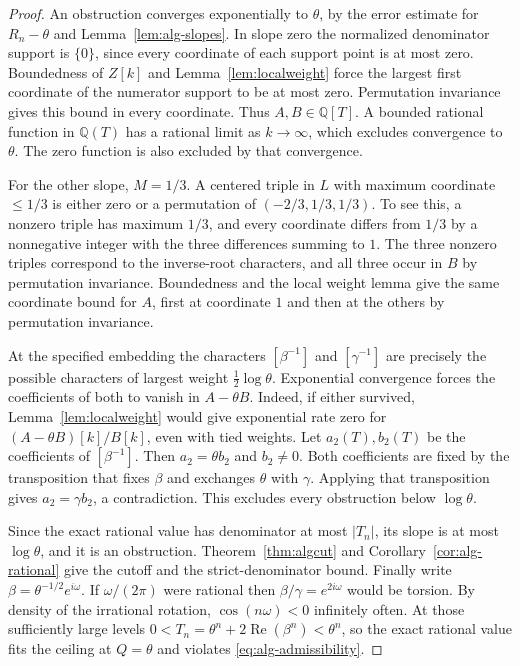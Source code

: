 \documentclass[11pt,a4paper,reqno]{amsart}
\theoremstyle{definition}
\theoremstyle{remark}
\numberwithin{equation}{section}
\begin{document}
\begin{proof}
An obstruction converges exponentially to \(\theta\), by the
error estimate for \(R_n-\theta\) and Lemma~\ref{lem:alg-slopes}.
In slope zero the normalized denominator support is \(\{0\}\),
since every coordinate of each support point is at most zero.
Boundedness of \(Z[k]\) and Lemma~\ref{lem:localweight} force the
largest first coordinate of the numerator support to be at most
zero. Permutation invariance gives this bound in every coordinate.
Thus \(A,B\in\mathbb Q[T]\). A bounded rational function in
\(\mathbb Q(T)\) has a rational limit as \(k\to\infty\), which
excludes convergence to \(\theta\). The zero function is also
excluded by that convergence.

For the other slope, \(M=1/3\). A centered triple in \(L\) with
maximum coordinate \(\le1/3\) is either zero or a permutation of
\((-2/3,1/3,1/3)\). To see this, a nonzero triple has maximum
\(1/3\), and every coordinate differs from \(1/3\) by a nonnegative
integer with the three differences summing to \(1\).
The three nonzero triples correspond to the inverse-root
characters, and all three occur in \(B\) by permutation
invariance. Boundedness and the local weight lemma give the same
coordinate bound for \(A\), first at coordinate \(1\) and then at
the others by permutation invariance.

At the specified embedding the characters \([\beta^{-1}]\)
and \([\gamma^{-1}]\) are precisely the possible characters of
largest weight \(\tfrac12\log\theta\). Exponential convergence
forces the coefficients of both to vanish in \(A-\theta B\).
Indeed, if either survived, Lemma~\ref{lem:localweight} would
give exponential rate zero for \((A-\theta B)[k]/B[k]\), even
with tied weights. Let \(a_2(T),b_2(T)\) be the coefficients
of \([\beta^{-1}]\). Then \(a_2=\theta b_2\) and \(b_2\ne0\).
Both coefficients are fixed by the transposition that fixes
\(\beta\) and exchanges \(\theta\) with \(\gamma\).
Applying that transposition gives \(a_2=\gamma b_2\), a
contradiction. This excludes every obstruction below \(\log\theta\).

Since the exact rational value has denominator at most
\(|T_n|\), its slope is at most \(\log\theta\), and it is an
obstruction. Theorem~\ref{thm:algcut} and
Corollary~\ref{cor:alg-rational} give the cutoff and the
strict-denominator bound. Finally write
\(\beta=\theta^{-1/2}e^{i\omega}\). If \(\omega/(2\pi)\) were
rational then \(\beta/\gamma=e^{2i\omega}\) would be torsion.
By density of the irrational rotation, \(\cos(n\omega)<0\)
infinitely often. At those sufficiently large levels
\(0<T_n=\theta^n+2\operatorname{Re}(\beta^n)<\theta^n\), so the exact
rational value fits the ceiling at \(Q=\theta\) and violates
\eqref{eq:alg-admissibility}.
\end{proof}
\end{document}
